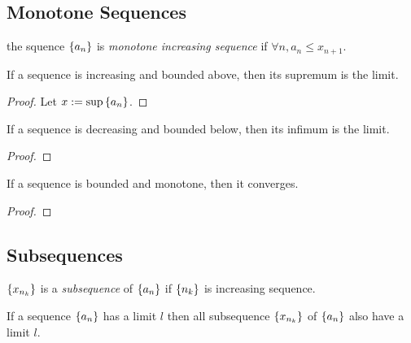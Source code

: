 \subsection{Monotone Sequences}

\begin{definition}
  \label{def:mono}
  the squence $\{a_n\}$ is \emph{monotone increasing sequence} if $\forall n,
    a_n \le x_{n+1}$.
\end{definition}

\begin{lemma}
  If a sequence is increasing and bounded above, then its supremum is the limit.
  \label{lem:mono_limit_1}
\end{lemma}

\begin{proof}
  Let $x := \sup{\{a_n\}}$.
\end{proof}

\begin{lemma}
  If a sequence is decreasing and bounded below, then its infimum is the limit.
  \label{lem:mono_limit_2}
\end{lemma}

\begin{proof}

\end{proof}

\begin{theorem}
  If a sequence is bounded and monotone, then it converges.
  \label{thm:mono_limit}
\end{theorem}

\begin{proof}

\end{proof}

\subsection{Subsequences}

\begin{definition}
  $\{x_{n_k}\}$ is a \emph{subsequence} of $\{a_n\}$ if $\{n_k\}$
  is increasing sequence.
  \label{def:sub}
\end{definition}

\begin{theorem}
  If a sequence $\{a_n\}$ has a limit $l$ then all subsequence
  $\{x_{n_k}\}$ of $\{a_n\}$ also have a limit $l$.
  \label{thm:sub_limit}
\end{theorem}

